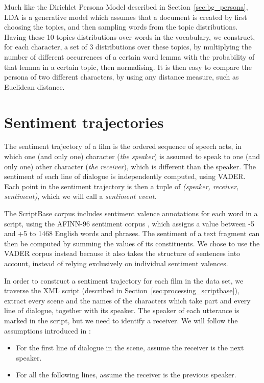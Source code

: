 \documentclass[bsc,frontabs,deptreport,singlespacing,parskip, twoside]{infthesis}
\begin{document}
Much like the Dirichlet Persona Model described in Section~\ref{sec:bg_persona}, LDA is a generative model which assumes that a document is created by first choosing the topics, and then sampling words from the topic distributions. Having these 10 topics distributions over words in the vocabulary, we construct, for each character, a set of 3 distributions over these topics, by multiplying the number of different occurrences of a certain word lemma with the probability of that lemma in a certain topic, then normalising. It is then easy to compare the persona of two different characters, by using any distance measure, such as Euclidean distance.

\section{Sentiment trajectories}
\label{sec:trajectories}
The sentiment trajectory of a film is the ordered sequence of speech acts, in which one (and only one) character (\textit{the speaker}) is assumed to speak to one (and only one) other character (\textit{the receiver}), which is different than the speaker. The sentiment of each line of dialogue is independently computed, using VADER. Each point in the sentiment trajectory is then a tuple of \textit{(speaker, receiver, sentiment)}, which we will call a \textit{sentiment event}.

The ScriptBase corpus includes sentiment valence annotations for each word in a script, using the AFINN-96 sentiment corpus \cite{nielsen2011new}, which assigns a value between -5 and +5 to 1468 English words and phrases. The sentiment of a text fragment can then be computed by summing the values of its constituents. We chose to use the VADER corpus instead because it also takes the structure of sentences into account, instead of relying exclusively on individual sentiment valences.

In order to construct a sentiment trajectory for each film in the data set, we traverse the XML script (described in Section~\ref{sec:processing_scriptbase}), extract every scene and the names of the characters which take part and every line of dialogue, together with its speaker. The speaker of each utterance is marked in the script, but we need to identify a receiver. We will follow the assumptions introduced in \cite{Nalisnick2013}:
\begin{itemize}
	\item For the first line of dialogue in the scene, assume the receiver is the next speaker.
	\item For all the following lines, assume the receiver is the previous speaker.
\end{itemize}
\end{document}
